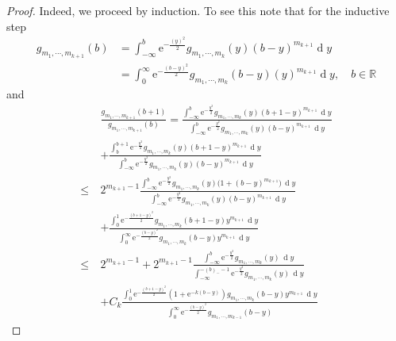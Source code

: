 \documentclass[11pt, reqno]{amsart}
\numberwithin{equation}{section}
\newcommand{\R}{\ensuremath{\mathbb{R}}}
\newcommand{\diff}{\ensuremath{\operatorname{d}\!}}
\begin{document}
\begin{proof}
    Indeed, we proceed by induction. To see this note that for the inductive step
    \begin{equation*}
    \begin{array}{cc}
         g_{m_1, \cdots, m_{k+1}}(b) &= \displaystyle\int^b_{-\infty}\mathrm{e}^{-\frac{(y)^2}{2}} g_{m_1, \cdots, m_{k}}(y)(b-y)^{m_{k+1}}\diff y\\
         & = \displaystyle\int^\infty_{0}\mathrm{e}^{-\frac{(b-y)^2}{2}} g_{m_1, \cdots, m_{k}}(b-y)(y)^{m_{k+1}}\diff y,\quad b\in \R
    \end{array}
    \end{equation*}
    and
\begin{align*}
& \frac{g_{m_1, \cdots, m_{k+1}}(b+1)}{g_{m_1, \cdots, m_{k+1}}(b)} =  \frac{
    \displaystyle \int_{-\infty}^b \mathrm{e}^{-\frac{y^2}{2}} g_{m_1, \cdots, m_k}(y)
    (b+1 - y)^{m_{k+1}} \, \diff y
}{
    \displaystyle \int_{-\infty}^b \mathrm{e}^{-\frac{y^2}{2}} g_{m_1, \cdots, m_k}(y)
    (b - y)^{m_{k+1}} \, \diff y
}
\\
& + \frac{
    \displaystyle \int_b^{b+1} \mathrm{e}^{-\frac{y^2}{2}} g_{m_1, \cdots, m_k}(y)
    (b+1 - y)^{m_{k+1}} \, \diff y
}{
    \displaystyle \int_{-\infty}^b \mathrm{e}^{-\frac{y^2}{2}} g_{m_1, \cdots, m_k}(y)
    (b - y)^{m_{k+1}} \, \diff y
} \\
\le\ & 2^{m_{k+1} - 1} \frac{
    \displaystyle \int_{-\infty}^b \mathrm{e}^{-\frac{y^2}{2}} g_{m_1, \cdots, m_k}(y)
    \bigl(1 + (b - y)^{m_{k+1}}\bigr) \, \diff y
}{
    \displaystyle \int_{-\infty}^b \mathrm{e}^{-\frac{y^2}{2}} g_{m_1, \cdots, m_k}(y)
    (b - y)^{m_{k+1}} \, \diff y
} \\
& + \frac{
    \displaystyle \int_0^1 \mathrm{e}^{-\frac{(b+1 - y)^2}{2}} g_{m_1, \cdots, m_k}(b+1 - y)
    y^{m_{k+1}} \, \diff y
}{
    \displaystyle \int_0^\infty \mathrm{e}^{-\frac{(b - y)^2}{2}} g_{m_1, \cdots, m_k}(b - y)
    y^{m_{k+1}} \, \diff y
} \\
\le\ & 2^{m_{k+1} - 1} + 2^{m_{k+1} - 1} 
\frac{
    \displaystyle \int_{-\infty}^b \mathrm{e}^{-\frac{y^2}{2}} g_{m_1, \cdots, m_k}(y) \, \diff y
}{
    \displaystyle \int_{-\infty}^{-(b)_- - 1} \mathrm{e}^{-\frac{y^2}{2}} g_{m_1, \cdots, m_k}(y) \, \diff y
} \\
& + C_k \frac{
    \displaystyle \int_0^1 \mathrm{e}^{-\frac{(b+1 - y)^2}{2}} (1 + \mathrm{e}^{-k(b - y)}) g_{m_1, \cdots, m_k}(b - y)
    y^{m_{k+1}} \, \diff y
}{
    \displaystyle \int_0^\infty \mathrm{e}^{-\frac{(b - y)^2}{2}} g_{m_1, \cdots, m_{k-1}}(b - y)
}
\end{align*}
\end{proof}
\end{document}
